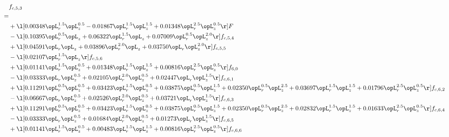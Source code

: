 \begin{alignat}{2} 
\label{eq:f_53_2} 
& f_{c,5,3} \nonumber \\ 
 = \\ 
& + \l[  0.00348 \opL_r^{1.5} \opL_z^{0.5}   -0.01867 \opL_r^{1.5} \opL_z^{1.5} +  0.01348 \opL_r^{2.5} \opL_z^{0.5}  \r] F \nonumber \\ 
& - \l[  0.10395 \opL_r^{0.5} \opL_z +  0.06322 \opL_r^{1.5} \opL_z +  0.07009 \opL_r^{0.5} \opL_z^{2.0}  \r] f_{c,5,4} \nonumber \\ 
& + \l[  0.04591 \opL_r \opL_z +  0.03896 \opL_r^{2.0} \opL_z +  0.03750 \opL_r \opL_z^{2.0}  \r] f_{c,5,5} \nonumber \\ 
& - \l[  0.02107 \opL_r^{1.5} \opL_z  \r] f_{c,5,6} \nonumber \\ 
& + \l[  0.01141 \opL_r^{1.5} \opL_z^{0.5} +  0.01348 \opL_r^{1.5} \opL_z^{1.5} +  0.00816 \opL_r^{2.5} \opL_z^{0.5}  \r] f_{6,0} \nonumber \\ 
& - \l[  0.03333 \opL_r \opL_z^{0.5} +  0.02105 \opL_r^{2.0} \opL_z^{0.5} +  0.02447 \opL_r \opL_z^{1.5}  \r] f_{c,6,1} \nonumber \\ 
& + \l[  0.11291 \opL_r^{0.5} \opL_z^{0.5} +  0.03423 \opL_r^{1.5} \opL_z^{0.5} +  0.03875 \opL_r^{0.5} \opL_z^{1.5} +  0.02350 \opL_r^{0.5} \opL_z^{2.5} +  0.03697 \opL_r^{1.5} \opL_z^{1.5} +  0.01796 \opL_r^{2.5} \opL_z^{0.5}  \r] f_{c,6,2} \nonumber \\ 
& - \l[  0.06667 \opL_r \opL_z^{0.5} +  0.02526 \opL_r^{2.0} \opL_z^{0.5} +  0.03721 \opL_r \opL_z^{1.5}  \r] f_{c,6,3} \nonumber \\ 
& + \l[  0.11291 \opL_r^{0.5} \opL_z^{0.5} +  0.03423 \opL_r^{1.5} \opL_z^{0.5} +  0.03875 \opL_r^{0.5} \opL_z^{1.5} +  0.02350 \opL_r^{0.5} \opL_z^{2.5} +  0.02832 \opL_r^{1.5} \opL_z^{1.5} +  0.01633 \opL_r^{2.5} \opL_z^{0.5}  \r] f_{c,6,4} \nonumber \\ 
& - \l[  0.03333 \opL_r \opL_z^{0.5} +  0.01684 \opL_r^{2.0} \opL_z^{0.5} +  0.01273 \opL_r \opL_z^{1.5}  \r] f_{c,6,5} \nonumber \\ 
& + \l[  0.01141 \opL_r^{1.5} \opL_z^{0.5} +  0.00483 \opL_r^{1.5} \opL_z^{1.5} +  0.00816 \opL_r^{2.5} \opL_z^{0.5}  \r] f_{c,6,6} \nonumber \\ 
\end{alignat} 



